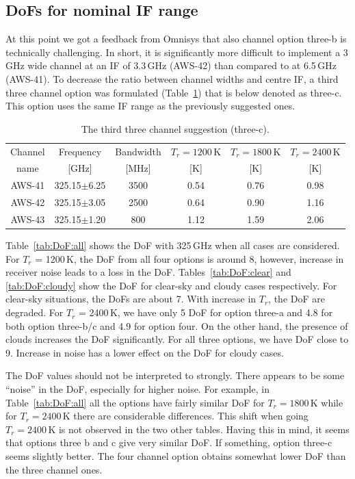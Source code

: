 \documentclass[12pt]{article}
\begin{document}
\subsection{DoFs for nominal IF range}

At this point we got a feedback from Omnisys that also channel option three-b is
technically challenging. In short, it is significantly more difficult to
implement a 3\,GHz wide channel at an IF of 3.3\,GHz (AWS-42) than compared to
at 6.5\,GHz (AWS-41). To decrease the ratio between channel widths and centre
IF, a third three channel option was formulated (Table~\ref{tab:chs:3c}) that
is below denoted as three-c. This option uses the same IF range as the
previously suggested ones.

\begin{table}[!p]
  \centering  
  \begin{tabular}[c]{c|c|c|ccc}
    Channel & Frequency   & Bandwidth & $T_r=1200$\,K
    & $T_r=1800$\,K & $T_r=2400$\,K\\
    name    & [GHz] &  [MHz] & [K]  & [K] & [K]\\
    \hline
    AWS-41  & 325.15$\pm$6.25 & 3500  & 0.54 & 0.76 & 0.98\\
    AWS-42  & 325.15$\pm$3.05 & 2500  & 0.64 & 0.90 & 1.16\\
    AWS-43  & 325.15$\pm$1.20 & \phantom{0}800 & 1.12 & 1.59 & 2.06\\
    \hline
  \end{tabular}
  \caption{The third three channel suggestion (three-c).}
  \label{tab:chs:3c}
\end{table}


Table~\ref{tab:DoF:all} shows the DoF with 325\,GHz when all cases are
considered. For $T_r$ = 1200\,K, the DoF from all four options is around 8,
however, increase in receiver noise leads to a loss in the DoF.
Tables~\ref{tab:DoF:clear} and \ref{tab:DoF:cloudy} show the DoF for
clear-sky and cloudy cases respectively. For clear-sky situations, the DoFs are
about 7. With increase in $T_r$, the DoF are degraded. For $T_r$ = 2400\,K, we
have only 5 DoF for option three-a and 4.8 for both option three-b/c and 4.9
for option four. On the other hand, the presence of clouds increases the DoF
significantly. For all three options, we have DoF close to 9. Increase in noise
has a lower effect on the DoF for cloudy cases.

The DoF values should not be interpreted to strongly. There appears to be some
``noise'' in the DoF, especially for higher noise. For example, in
Table~\ref{tab:DoF:all} all the options have fairly similar DoF for
$T_r=1800$\,K while for $T_r=2400$\,K there are considerable differences. This
shift when going $T_r=2400$\,K is not observed in the two other tables. Having
this in mind, it seems that options three b and c give very similar DoF. If
something, option three-c seems slightly better. The four channel option
obtains somewhat lower DoF than the three channel ones.
\end{document}
